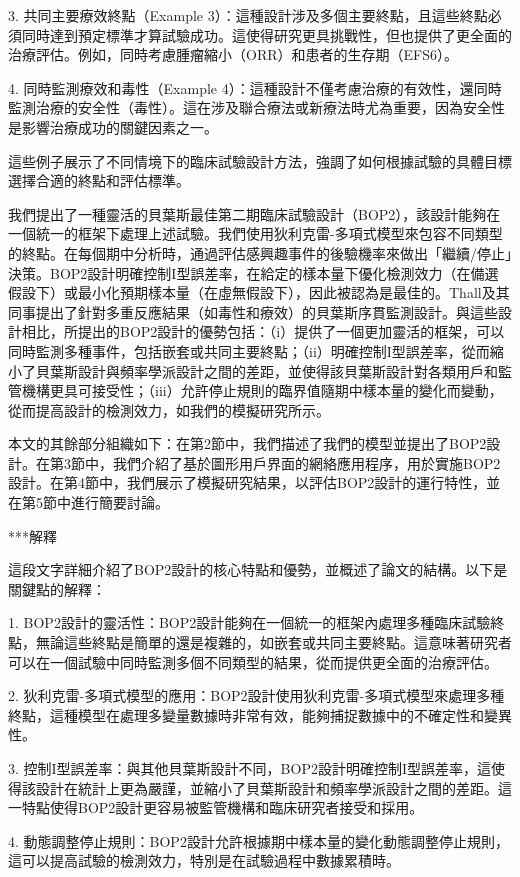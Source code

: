 3. 共同主要療效終點（Example 3）：這種設計涉及多個主要終點，且這些終點必須同時達到預定標準才算試驗成功。這使得研究更具挑戰性，但也提供了更全面的治療評估。例如，同時考慮腫瘤縮小（ORR）和患者的生存期（EFS6）。

4. 同時監測療效和毒性（Example 4）：這種設計不僅考慮治療的有效性，還同時監測治療的安全性（毒性）。這在涉及聯合療法或新療法時尤為重要，因為安全性是影響治療成功的關鍵因素之一。

這些例子展示了不同情境下的臨床試驗設計方法，強調了如何根據試驗的具體目標選擇合適的終點和評估標準。



我們提出了一種靈活的貝葉斯最佳第二期臨床試驗設計（BOP2），該設計能夠在一個統一的框架下處理上述試驗。我們使用狄利克雷-多項式模型來包容不同類型的終點。在每個期中分析時，通過評估感興趣事件的後驗機率來做出「繼續/停止」決策。BOP2設計明確控制I型誤差率，在給定的樣本量下優化檢測效力（在備選假設下）或最小化預期樣本量（在虛無假設下），因此被認為是最佳的。Thall及其同事提出了針對多重反應結果（如毒性和療效）的貝葉斯序貫監測設計。與這些設計相比，所提出的BOP2設計的優勢包括：（i）提供了一個更加靈活的框架，可以同時監測多種事件，包括嵌套或共同主要終點；（ii）明確控制I型誤差率，從而縮小了貝葉斯設計與頻率學派設計之間的差距，並使得該貝葉斯設計對各類用戶和監管機構更具可接受性；（iii）允許停止規則的臨界值隨期中樣本量的變化而變動，從而提高設計的檢測效力，如我們的模擬研究所示。

本文的其餘部分組織如下：在第2節中，我們描述了我們的模型並提出了BOP2設計。在第3節中，我們介紹了基於圖形用戶界面的網絡應用程序，用於實施BOP2設計。在第4節中，我們展示了模擬研究結果，以評估BOP2設計的運行特性，並在第5節中進行簡要討論。

***解釋

這段文字詳細介紹了BOP2設計的核心特點和優勢，並概述了論文的結構。以下是關鍵點的解釋：

1. BOP2設計的靈活性：BOP2設計能夠在一個統一的框架內處理多種臨床試驗終點，無論這些終點是簡單的還是複雜的，如嵌套或共同主要終點。這意味著研究者可以在一個試驗中同時監測多個不同類型的結果，從而提供更全面的治療評估。

2. 狄利克雷-多項式模型的應用：BOP2設計使用狄利克雷-多項式模型來處理多種終點，這種模型在處理多變量數據時非常有效，能夠捕捉數據中的不確定性和變異性。

3. 控制I型誤差率：與其他貝葉斯設計不同，BOP2設計明確控制I型誤差率，這使得該設計在統計上更為嚴謹，並縮小了貝葉斯設計和頻率學派設計之間的差距。這一特點使得BOP2設計更容易被監管機構和臨床研究者接受和採用。

4. 動態調整停止規則：BOP2設計允許根據期中樣本量的變化動態調整停止規則，這可以提高試驗的檢測效力，特別是在試驗過程中數據累積時。

